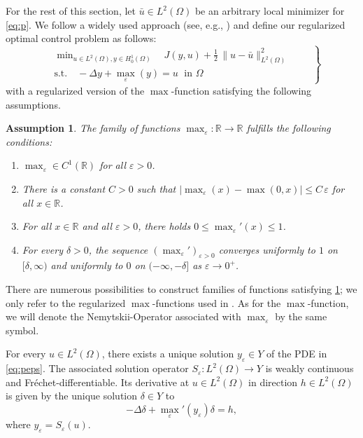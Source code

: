 \documentclass[reqno]{shinyart}
\newtheorem{assumption}[theorem]{Assumption}
\begin{document}
For the rest of this section, let $\bar{u}\in L^2(\Omega)$ be an arbitrary local 
minimizer for \eqref{eq:p}. We follow a widely used approach (see, e.g., \cite{mp84}) and define 
our regularized optimal control problem as follows:
\begin{equation}\tag{P$_\varepsilon$}\label{eq:peps}
    \left.
        \begin{aligned}
            &\min\nolimits_{u \in L^2(\Omega), y \in H_0^1(\Omega)}  \quad J(y,u) + \frac{1}{2}\,\|u - \bar{u}\|_{L^2(\Omega)}^2\\
            &\text{s.t.} \quad -\Delta y + {\max\nolimits}_\varepsilon(y) = u \; \text{ in }\Omega
        \end{aligned}
    \qquad \right\}
\end{equation}
with a regularized version of the $\max$-function satisfying the following assumptions.
\begin{assumption}\label{assu:maxeps}
    The family of functions ${\max\nolimits}_\varepsilon: {\mathbb{R}} \to {\mathbb{R}}$ fulfills the following conditions:
    \begin{enumerate}[label=(\roman*)]
        \item\label{it:maxeps1} ${\max\nolimits}_\varepsilon \in C^1({\mathbb{R}})$ for all $\varepsilon > 0$. 
        \item\label{it:maxeps2} There is a constant $C>0$ such that 
            $|{\max\nolimits}_\varepsilon(x) - \max(0,x)| \leq C\,\varepsilon$ for all $x\in {\mathbb{R}}$.
        \item\label{it:maxeps3} For all $x\in {\mathbb{R}}$ and all $\varepsilon > 0$, 
            there holds $0 \leq {\max\nolimits}_\varepsilon'(x) \leq 1$.
        \item\label{it:maxeps4} For every $\delta > 0$, the sequence 
            $({\max\nolimits}_\varepsilon')_{\varepsilon > 0}$ converges uniformly to $1$ on $[\delta, \infty)$ and 
            uniformly to $0$ on $(-\infty, -\delta]$ as $\varepsilon \to 0^+$.
    \end{enumerate}
\end{assumption}

There are numerous possibilities to construct families of functions satisfying 
\cref{assu:maxeps}; we only refer to the regularized $\max$-functions used in \cite{mp84, sw13}.
As for the $\max$-function, we will denote the Nemytskii-Operator 
associated with ${\max\nolimits}_\varepsilon$ by the same symbol.

\begin{lemma}\label{lem:Sepsfrechet}
    For every $u \in L^2(\Omega)$, there exists a unique solution $y_\varepsilon \in Y$ 
    of the PDE in \eqref{eq:peps}. The associated solution operator 
    $S_\varepsilon : L^2(\Omega) \to Y$ is weakly continuous and Fr\'echet-differentiable. Its derivative 
    at $u\in L^2(\Omega)$ in direction $h\in L^2(\Omega)$ is given by the unique solution $\delta \in Y$ to
    \begin{equation}\label{eq:linpdeeps}
        -\Delta \delta + {\max\nolimits}_\varepsilon'(y_\varepsilon)\delta = h,
    \end{equation}  
    where $y_\varepsilon = S_\varepsilon(u)$.
\end{lemma}
\end{document}
